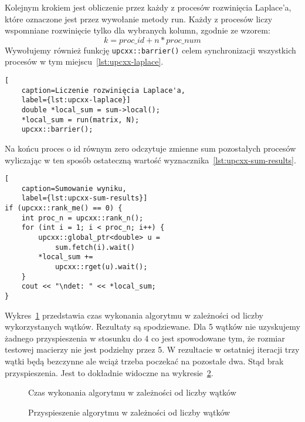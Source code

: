 Kolejnym krokiem jest obliczenie przez każdy z procesów
rozwinięcia Laplace'a, które oznaczone jest przez wywołanie metody run.
Każdy z procesów liczy wspomniane rozwinięcie tylko dla wybranych kolumn, zgodnie
ze wzorem:
\begin{equation}
    k = proc\_id + n*proc\_num
\end{equation}
Wywołujemy również funkcję \texttt{upcxx::barrier()} celem synchronizacji wszystkich
procesów w tym miejscu~\ref{lst:upcxx-laplace}.

\begin{lstlisting}[
    caption=Liczenie rozwinięcia Laplace'a,
    label={lst:upcxx-laplace}]
    double *local_sum = sum->local();
    *local_sum = run(matrix, N);
    upcxx::barrier();
\end{lstlisting}

Na końcu proces o id równym zero odczytuje zmienne sum pozostałych
procesów wyliczając w ten sposób ostateczną
wartość wyznacznika~\ref{lst:upcxx-sum-results}.

\begin{lstlisting}[
    caption=Sumowanie wyniku,
    label={lst:upcxx-sum-results}]
if (upcxx::rank_me() == 0) {
    int proc_n = upcxx::rank_n();
    for (int i = 1; i < proc_n; i++) {
        upcxx::global_ptr<double> u =
            sum.fetch(i).wait()
        *local_sum +=
            upcxx::rget(u).wait();
    }
    cout << "\ndet: " << *local_sum;
}
\end{lstlisting}

Wykres~\ref{fig:upcxx-matrixdet-time} przedstawia czas wykonania algorytmu w zależności
od liczby wykorzystanych wątków.
Rezultaty są spodziewane.
Dla 5 wątków nie uzyskujemy żadnego przyspieszenia w stosunku
do 4 co jest spowodowane tym, że rozmiar testowej macierzy nie jest podzielny przez 5.
W rezultacie w ostatniej iteracji trzy wątki będą bezczynne ale wciąż trzeba poczekać na
pozostałe dwa.
Stąd brak przyspieszenia.
Jest to dokładnie widoczne na wykresie~\ref{fig:upcxx-matrixdet-speedup}.

\begin{figure}[h]
    \centering
    
    \caption{Czas wykonania algorytmu w zależności od liczby wątków}
    \label{fig:upcxx-matrixdet-time}
\end{figure}

\begin{figure}[h]
    \centering
    
    \caption{Przyspieszenie algorytmu w zależności od liczby wątków}
    \label{fig:upcxx-matrixdet-speedup}
\end{figure}

